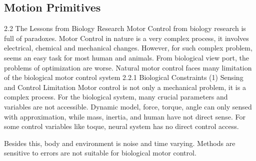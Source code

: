 \subsection{Motion Primitives}
2.2 The Lessons from Biology Research
Motor Control from biology research is full of paradoxes.
Motor Control in nature is a very complex process, it involves electrical, chemical and mechanical changes. However, for such complex problem, seems an easy task for most human and animals.
From biological view port, the problems of optimization are worse. Natural motor control faces many limitation of the biological motor control system
2.2.1 Biological Constraints
(1) Sensing and Control Limitation
Motor control is not only a mechanical problem, it is a complex process. For the biological system,  many crucial parameters and variables are not accessible. Dynamic model, force, torque, angle can only sensed with approximation, while mass, inertia, and human have not direct sense. For some control variables like toque, neural system has no direct control access.

Besides this, body and environment is noise and time varying.
Methods are sensitive to errors are not suitable for biological motor control.

